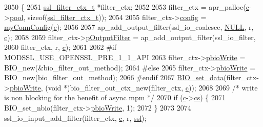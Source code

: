 \begin{DoxyCode}
2050 \{
2051     \hyperlink{structssl__filter__ctx__t}{ssl\_filter\_ctx\_t} *filter\_ctx;
2052 
2053     filter\_ctx = apr\_palloc(\hyperlink{group__APACHE__CORE__HTTPD_ga7cce37ef8558e46f408cb4d0f555605b}{c}->\hyperlink{structconn__rec_a1dc5f31c7afc4a6f9c4ede0daea8cd1d}{pool}, \textcolor{keyword}{sizeof}(\hyperlink{structssl__filter__ctx__t}{ssl\_filter\_ctx\_t}));
2054 
2055     filter\_ctx->\hyperlink{structssl__filter__ctx__t_a32fefb77938fada5528a8b9538a7d234}{config}          = \hyperlink{group__MOD__SSL__PRIVATE_ga8a3e05c43e4243e56d3f1f6ee3f2d579}{myConnConfig}(\hyperlink{group__APACHE__CORE__HTTPD_ga7cce37ef8558e46f408cb4d0f555605b}{c});
2056 
2057     ap\_add\_output\_filter(ssl\_io\_coalesce, \hyperlink{pcre_8txt_ad7f989d16aa8ca809a36bc392c07fba1}{NULL}, r, \hyperlink{group__APACHE__CORE__HTTPD_ga7cce37ef8558e46f408cb4d0f555605b}{c});
2058 
2059     filter\_ctx->\hyperlink{structssl__filter__ctx__t_acc7e53b50f69ac29a017ed7f4c336691}{pOutputFilter}   = ap\_add\_output\_filter(ssl\_io\_filter,
2060                                                        filter\_ctx, r, \hyperlink{group__APACHE__CORE__HTTPD_ga7cce37ef8558e46f408cb4d0f555605b}{c});
2061 
2062 \textcolor{preprocessor}{#if MODSSL\_USE\_OPENSSL\_PRE\_1\_1\_API}
2063     filter\_ctx->\hyperlink{structssl__filter__ctx__t_a4e449f415486ddfd7479a71b72eaca2e}{pbioWrite}       = BIO\_new(&bio\_filter\_out\_method);
2064 \textcolor{preprocessor}{#else}
2065     filter\_ctx->\hyperlink{structssl__filter__ctx__t_a4e449f415486ddfd7479a71b72eaca2e}{pbioWrite}       = BIO\_new(bio\_filter\_out\_method);
2066 \textcolor{preprocessor}{#endif}
2067     \hyperlink{group__MOD__SSL__PRIVATE_ga950a4a5d400bf1dc5eb708718f479632}{BIO\_set\_data}(filter\_ctx->\hyperlink{structssl__filter__ctx__t_a4e449f415486ddfd7479a71b72eaca2e}{pbioWrite}, (\textcolor{keywordtype}{void} *)bio\_filter\_out\_ctx\_new(filter\_ctx, 
      \hyperlink{group__APACHE__CORE__HTTPD_ga7cce37ef8558e46f408cb4d0f555605b}{c}));
2068 
2069     \textcolor{comment}{/* write is non blocking for the benefit of async mpm */}
2070     \textcolor{keywordflow}{if} (\hyperlink{group__APACHE__CORE__HTTPD_ga7cce37ef8558e46f408cb4d0f555605b}{c}->\hyperlink{structconn__rec_a1cfa5dbd0193d91302d8ae0953bcbda1}{cs}) \{
2071         BIO\_set\_nbio(filter\_ctx->\hyperlink{structssl__filter__ctx__t_a4e449f415486ddfd7479a71b72eaca2e}{pbioWrite}, 1);
2072     \}
2073 
2074     ssl\_io\_input\_add\_filter(filter\_ctx, \hyperlink{group__APACHE__CORE__HTTPD_ga7cce37ef8558e46f408cb4d0f555605b}{c}, r, \hyperlink{group__MOD__SSL_ga91d808d6c1c01029f9c9260b9b69a437}{ssl});

\end{DoxyCode}
